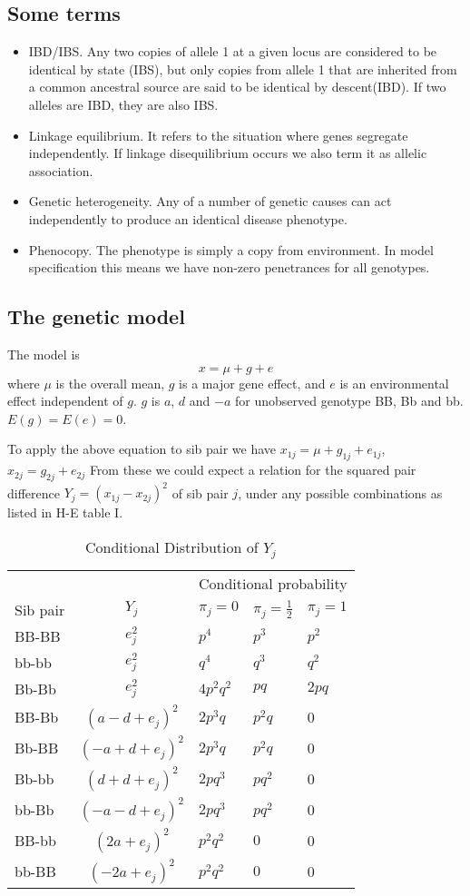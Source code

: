 \subsection{Some terms}
\begin{itemize}
\item{IBD/IBS.} Any two copies of allele 1 at a given locus are
considered to be identical by state (IBS), but only copies from
allele 1 that are inherited from a common ancestral source are said
to be identical by descent(IBD). If two alleles are IBD, they are
also IBS.
\item{Linkage equilibrium.} It refers to the situation where genes segregate
independently. If linkage disequilibrium occurs we also term it as allelic association.
\item{Genetic heterogeneity.} Any of a number of genetic causes can act
independently to produce an identical disease phenotype.
\item{Phenocopy.} The phenotype is simply a copy from environment. In model
specification this means we have non-zero penetrances for all genotypes.
\end{itemize}

\subsection{The genetic model}
The model is $$  x=\mu + g + e$$
where $\mu$ is the overall mean, $g$ is a major gene effect, and $e$ is an
environmental effect independent of $g$.  $g$ is $a$, $d$ and $-a$ for unobserved
genotype BB, Bb and bb.  $E(g)=E(e)=0$.

To apply the above equation to sib pair we have $x_{1j}=\mu +
g_{1j}+e_{1j}$, $x_{2j}=g_{2j}+e_{2j}$ From these we could expect a relation
for the squared pair difference $Y_j={(x_{1j}-x_{2j})}^2$ of sib pair $j$,
under any possible combinations as listed in H-E table I.

\begin{table}[h]\centering
\caption{Conditional Distribution of $Y_j$\label{table1}}
\begin{tabular}{lclll}
\hline
&&\multicolumn{3}{c}{Conditional probability}\\ \cline{3-5}
Sib pair& $Y_j$& $\pi_j=0$ & $\pi_j=\frac{1}{2}$ & $\pi_j=1$\\
\hline
BB-BB &$e_j^2$ & $p^4$ & $p^3$ & $p^2$\\
bb-bb &$e_j^2$ & $q^4$ & $q^3$ & $q^2$\\
Bb-Bb &$e_j^2$ & $4p^2q^2$ & $pq$ & $2pq$\\
BB-Bb &$(a-d+e_j)^2$ & $2p^3q$ & $p^2q$ & 0\\
Bb-BB &$(-a+d+e_j)^2$&$2p^3q$ &$p^2q$ & 0 \\
Bb-bb &$(d+d+e_j)^2$&$2pq^3$ &$pq^2$ & 0 \\
bb-Bb &$(-a-d+e_j)^2$&$2pq^3$ &$pq^2$ & 0 \\
BB-bb &$(2a+e_j)^2$&$p^2q^2$ &$0$ & 0 \\
bb-BB &$(-2a+e_j)^2$&$p^2q^2$ &$0$ & 0 \\
\hline
\end{tabular}
\end{table}

